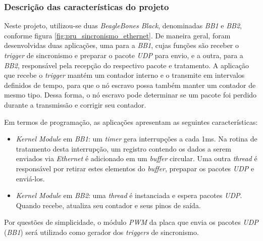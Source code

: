 \subsubsection{Descrição das características do projeto}

Neste projeto, utilizou-se duas \textit{BeagleBones Black}, denominadas
\textit{BB1} e \textit{BB2}, conforme figura \ref{fig:pru_sincronismo_ethernet}.
De maneira geral, foram desenvolvidas duas aplicações, uma para a \textit{BB1},
cujas funções são receber o \textit{trigger} de sincronismo e preparar o pacote
\textit{UDP} para envio, e a outra, para a \textit{BB2}, responsável pela
recepção do respectivo pacote e tratamento.
A aplicação que recebe o \textit{trigger} mantém um contador interno e o
transmite em intervalos definidos de tempo, para que o nó escravo possa também
manter um contador de mesmo tipo. Dessa forma, o nó escravo pode determinar se
um pacote foi perdido durante a transmissão e corrigir seu contador.

\vspace{12pt}

Em termos de programação, as aplicações apresentam as seguintes características:

\begin{itemize} \renewcommand\labelitemi{--}
  \item \textit{Kernel Module} em \textit{BB1}: um \textit{timer} gera
  interrupções a cada 1ms. Na rotina de tratamento desta interrupção, um
  registro contendo os dados a serem enviados via \textit{Ethernet} é
  adicionado em um \textit{buffer} circular. Uma outra \textit{thread}
  é responsável por retirar estes elementos do \textit{buffer}, prepapar os
  pacotes \textit{UDP} e enviá-los.

  \item \textit{Kernel Module} em \textit{BB2}: uma \textit{thread} é
  instanciada e espera pacotes \textit{UDP}. Quando recebe, atualiza seu
  contador e seus pinos de saída.
\end{itemize}

Por questões de simplicidade, o módulo \textit{PWM} da placa que envia os
pacotes \textit{UDP} (\textit{BB1}) será utilizado como gerador dos
\textit{triggers} de sincronismo. 


